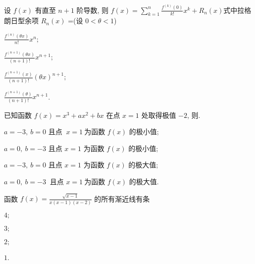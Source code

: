 \begin{problem}
设 $f(x)$ 有直至 $n + 1$ 阶导数, 则
$\displaystyle f\left( x \right) = \sum_{k = 1}^{n}{\frac{f^{\left( k \right)}\left( 0 \right)}{k!}x^{k}} + R_{n}\left( x \right)$式中拉格朗日型余项
$R_{n}\left( x \right)$ =(设 $0 < \theta < 1$)

\begin{abcd} \item $\displaystyle \frac{f^{\left( n \right)}\left( \theta x \right)}{n!}x^{n};$

\item
$\displaystyle \frac{f^{\left( n + 1 \right)}\left( \theta x \right)}{\left( n + 1 \right)!}x^{n + 1};$

\item
$\displaystyle \frac{f^{\left( n + 1 \right)}\left( x \right)}{\left( n + 1 \right)!}\left( \theta x \right)^{n + 1};$

\item
$\displaystyle \frac{f^{\left( n + 1 \right)}\left( \theta \right)}{\left( n + 1 \right)!}x^{n + 1}$.

\end{abcd}

\end{problem}

\begin{problem}
已知函数 $f\left( x \right) = x^{3} + ax^{2} + bx$ 在点 $x = 1$
处取得极值 $- 2$, 则.

\begin{abcd}

\item $a = - 3,\ b = 0$ 且点 $\ x = 1\ $为函数 $f(x)$ 的极小值;

\item $a = 0,\ b = - 3$ 且点 $x = 1$ 为函数 $f(x)$ 的极小值;

\item $a = - 3,\ b = 0$ 且点 $x = 1$ 为函数 $f(x)$ 的极大值;

\item $a = 0,\ b = - 3\ $ 且点 $x = 1\ $为函数 $f(x)$ 的极大值.

\end{abcd}

\end{problem}

\begin{problem} 
函数
$f\left( x \right) = \displaystyle \frac{\sqrt{x - 1}}{x\left( x - 1 \right)\left( x - 2 \right)}$
的所有渐近线有条

\begin{abcd} \item $4;$

\item $3;$

\item $2;$

\item $1$.

\end{abcd}

\end{problem}


